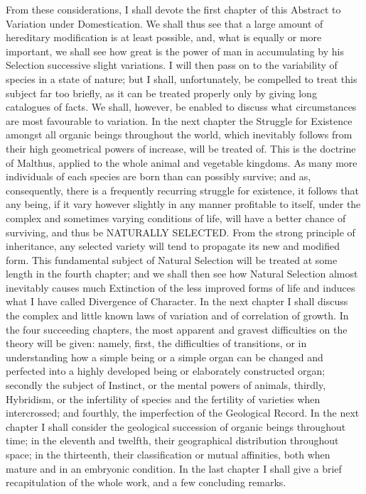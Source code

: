 From these considerations, I shall devote the first chapter of this Abstract to Variation under Domestication. We shall thus see that a large amount of hereditary modification is at least possible, and, what is equally or more important, we shall see how great is the power of man in accumulating by his Selection successive slight variations. I will then pass on to the variability of species in a state of nature; but I shall, unfortunately, be compelled to treat this subject far too briefly, as it can be treated properly only by giving long catalogues of facts. We shall, however, be enabled to discuss what circumstances are most favourable to variation. In the next chapter the Struggle for Existence amongst all organic beings throughout the world, which inevitably follows from their high geometrical powers of increase, will be treated of. This is the doctrine of Malthus, applied to the whole animal and vegetable kingdoms. As many more individuals of each species are born than can possibly survive; and as, consequently, there is a frequently recurring struggle for existence, it follows that any being, if it vary however slightly in any manner profitable to itself, under the complex and sometimes varying conditions of life, will have a better chance of surviving, and thus be NATURALLY SELECTED. From the strong principle of inheritance, any selected variety will tend to propagate its new and modified form.
This fundamental subject of Natural Selection will be treated at some length in the fourth chapter; and we shall then see how Natural Selection almost inevitably causes much Extinction of the less improved forms of life and induces what I have called Divergence of Character. In the next chapter I shall discuss the complex and little known laws of variation and of correlation of growth. In the four succeeding chapters, the most apparent and gravest difficulties on the theory will be given: namely, first, the difficulties of transitions, or in understanding how a simple being or a simple organ can be changed and perfected into a highly developed being or elaborately constructed organ; secondly the subject of Instinct, or the mental powers of animals, thirdly, Hybridism, or the infertility of species and the fertility of varieties when intercrossed; and fourthly, the imperfection of the Geological Record. In the next chapter I shall consider the geological succession of organic beings throughout time; in the eleventh and twelfth, their geographical distribution throughout space; in the thirteenth, their classification or mutual affinities, both when mature and in an embryonic condition. In the last chapter I shall give a brief recapitulation of the whole work, and a few concluding remarks.

